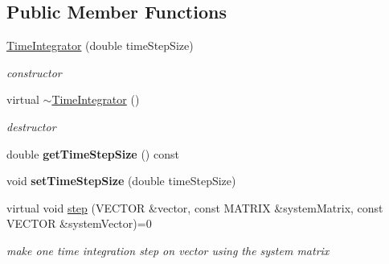 \subsection*{Public Member Functions}
\begin{DoxyCompactItemize}
\item 
\hypertarget{classnatrium_1_1TimeIntegrator_a420ea9baabf0839bc8ecb5f5e02ce95b}{\hyperlink{classnatrium_1_1TimeIntegrator_a420ea9baabf0839bc8ecb5f5e02ce95b}{Time\-Integrator} (double time\-Step\-Size)}\label{classnatrium_1_1TimeIntegrator_a420ea9baabf0839bc8ecb5f5e02ce95b}

\begin{DoxyCompactList}\small\item\em constructor \end{DoxyCompactList}\item 
\hypertarget{classnatrium_1_1TimeIntegrator_a8795d06c5322b72a5a2a1f30aa7a051d}{virtual \hyperlink{classnatrium_1_1TimeIntegrator_a8795d06c5322b72a5a2a1f30aa7a051d}{$\sim$\-Time\-Integrator} ()}\label{classnatrium_1_1TimeIntegrator_a8795d06c5322b72a5a2a1f30aa7a051d}

\begin{DoxyCompactList}\small\item\em destructor \end{DoxyCompactList}\item 
\hypertarget{classnatrium_1_1TimeIntegrator_a6e763133e114cdd758307ca30b65f161}{double {\bfseries get\-Time\-Step\-Size} () const }\label{classnatrium_1_1TimeIntegrator_a6e763133e114cdd758307ca30b65f161}

\item 
\hypertarget{classnatrium_1_1TimeIntegrator_a18592866e946c63ab1595d3ab688ea6b}{void {\bfseries set\-Time\-Step\-Size} (double time\-Step\-Size)}\label{classnatrium_1_1TimeIntegrator_a18592866e946c63ab1595d3ab688ea6b}

\item 
\hypertarget{classnatrium_1_1TimeIntegrator_a09e1ad9254abec537cda42b1d2fb83e6}{virtual void \hyperlink{classnatrium_1_1TimeIntegrator_a09e1ad9254abec537cda42b1d2fb83e6}{step} (V\-E\-C\-T\-O\-R \&vector, const M\-A\-T\-R\-I\-X \&system\-Matrix, const V\-E\-C\-T\-O\-R \&system\-Vector)=0}\label{classnatrium_1_1TimeIntegrator_a09e1ad9254abec537cda42b1d2fb83e6}

\begin{DoxyCompactList}\small\item\em make one time integration step on vector using the system matrix \end{DoxyCompactList}\end{DoxyCompactItemize}


